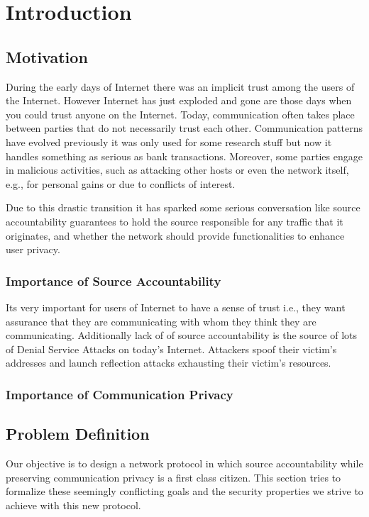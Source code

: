 
\chapter{Introduction} %

\label{intro} %

\section{Motivation}
During the early days of Internet there was an implicit trust among the users of the Internet. However Internet has just exploded and gone are those days when you could trust anyone on the Internet. Today, communication often takes place between parties that do not necessarily trust each other. Communication patterns have evolved previously it was only used for some research stuff but now it handles something as serious as bank transactions. Moreover, some parties engage in malicious activities, such as attacking other hosts or even the network itself, e.g., for personal gains or due to conflicts of interest.

Due to this drastic transition it has sparked some serious conversation like source accountability guarantees to hold the source responsible for any traffic that it originates, and whether the network should provide functionalities to enhance user privacy.

\subsection{Importance of Source Accountability}
Its very important for users of Internet to have a sense of trust i.e., they want assurance that they are communicating with whom they think they are communicating. Additionally lack of of source accountability is the source of lots of Denial Service Attacks on today's Internet. Attackers spoof their victim's addresses and launch reflection attacks exhausting their victim's resources.

\subsection{Importance of Communication Privacy}

\section{Problem Definition}
Our objective is to design a network protocol in which source accountability while preserving communication privacy is a first class citizen. This section tries to formalize these seemingly conflicting goals and the security  properties we strive to achieve with this new protocol.


